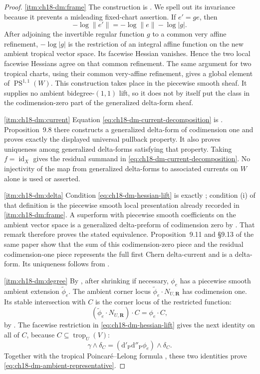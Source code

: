 \begin{proof}
\cref{itm:ch18-dm:frame}
The construction is \cite[\S9.7]{GK17}.  We spell out its invariance
because it prevents a misleading fixed-chart assertion.  If \(e'=ge\),
then
\[
  -\log\|e'\|=-\log\|e\|-\log|g|.
\]
After adjoining the invertible regular function \(g\) to a common very
affine refinement, \(-\log|g|\) is the restriction of an integral affine
function on the new ambient tropical vector space.  Its facewise Hessian
vanishes.  Hence the two local facewise Hessians agree on that common
refinement.  The same argument for two tropical charts, using their common
very-affine refinement, gives a global element of
\(\operatorname{PS}^{1,1}(W)\).  This construction takes place in the
piecewise smooth sheaf.  It supplies no ambient bidegree-\((1,1)\) lift, so
it does not by itself put the class in the codimension-zero part of the
generalized delta-form sheaf.

\cref{itm:ch18-dm:current}
Equation \eqref{eq:ch18-dm-current-decomposition} is
\cite[(9.7.1)]{GK17}.  Proposition~9.8 there constructs a generalized
delta-form of codimension one and proves exactly the displayed universal
pullback property.  It also proves uniqueness among generalized delta-forms
satisfying that property.  Taking \(f=\operatorname{id}_X\) gives the
residual summand in \eqref{eq:ch18-dm-current-decomposition}.  No injectivity
of the map from generalized delta-forms to associated currents on \(W\)
alone is used or asserted.

\cref{itm:ch18-dm:delta}
Condition \eqref{eq:ch18-dm-hessian-lift} is exactly
\cite[Definition~9.9(ii)]{GK17}; condition (i) of that definition is the
piecewise smooth local presentation already recorded in
\cref{itm:ch18-dm:frame}.  A superform with piecewise smooth coefficients on
the ambient vector space is a generalized delta-preform of codimension zero
by \cite[Remark~9.10 and Example~2.10]{GK17}.  That remark therefore proves
the stated equivalence.  Proposition~9.11 and \S9.13 of the same paper show
that the sum of this codimension-zero piece and the residual codimension-one
piece represents the full first Chern delta-current and is a delta-form.
Its uniqueness follows from \cite[Proposition~6.8 and
Definition~9.12]{GK17}.

\cref{itm:ch18-dm:degree}
By \cite[Proposition~1.8]{GK17}, after shrinking if necessary,
\(\phi_e\) has a piecewise smooth ambient extension
\(\widetilde\phi_e\).  The ambient corner locus
\(\widetilde\phi_e\cdot N_{U,\mathbf R}\) has codimension one.  Its stable
intersection with \(C\) is the corner locus of the restricted function:
\[
   (\widetilde\phi_e\cdot N_{U,\mathbf R})\cdot C
      =\phi_e\cdot C,
\]
by \cite[Proposition~1.14 and Corollary~1.15]{GK17}.  The facewise
restriction in \eqref{eq:ch18-dm-hessian-lift} gives the next identity on
all of \(C\), because \(C\subseteq\operatorname{trop}_U(V)\):
\[
   \gamma\wedge\delta_C
    =(\mathrm d'_{\mathrm P}\mathrm d''_{\mathrm P}\phi_e)
       \wedge\delta_C.
\]
Together with the tropical Poincar\'e--Lelong formula
\cite[Corollary~3.19]{GK17}, these two identities prove
\eqref{eq:ch18-dm-ambient-representative}.


\end{proof}
